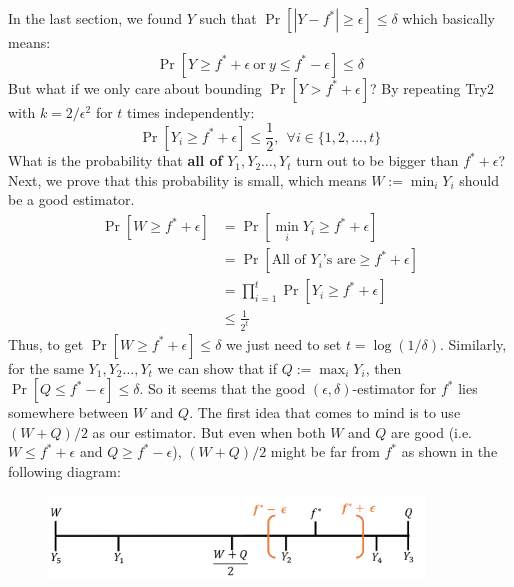 \documentclass[11pt]{article}
\begin{document}
In the last section, we found $Y$ such that $\Pr[|Y - f^*| \geq \epsilon] \leq \delta$ which basically means:
\begin{equation*}
    \Pr[Y \geq f^* + \epsilon \ \text{or} \  y \leq f^* - \epsilon] \leq \delta
\end{equation*}
But what if we only care about bounding $\Pr[Y > f^* + \epsilon]$? By repeating Try2 with $k = 2/\epsilon^2$ for $t$ times independently:
\begin{equation*}
    \Pr[Y_i \geq f^* + \epsilon] \leq \frac{1}{2}, \ \ \forall i\in\{1,2,\dots,t\}
\end{equation*}
What is the probability that \textbf{all of} $Y_1,Y_2\dots,Y_t$ turn out to be bigger than $f^* + \epsilon$? Next, we prove that this probability is small, which means $W := \min_i Y_i$ should be a good estimator.
\begin{align*}
    \Pr[W \geq f^* + \epsilon] &= \Pr[\min_i Y_i \geq f^* + \epsilon] \\&= \Pr[\text{All of $Y_i$'s are} \geq f^* + \epsilon]\\ &= \prod\limits_{i=1}^t \Pr[Y_i \geq f^* + \epsilon] \\&\leq \frac{1}{2^t}
\end{align*}
Thus, to get $\Pr[W \geq f^* + \epsilon] \leq \delta$ we just need to set $t = \log{(1/\delta)}$.
Similarly, for the same $Y_1,Y_2\dots,Y_t$ we can show that if $Q := \max_i Y_i$, then $\Pr[Q \leq f^* - \epsilon] \leq \delta$. So it seems that the good $(\epsilon,\delta)$-estimator for $f^*$ lies somewhere between $W$ and $Q$. The first idea that comes to mind is to use $(W+Q)/2$ as our estimator. But even when both $W$ and $Q$ are good (i.e. $W \leq f^*+ \epsilon$ and $Q \geq f^*- \epsilon$), $(W+Q)/2$ might be far from $f^*$ as shown in the following diagram:
\begin{figure}[h]
\centering
\includegraphics[width=10cm]{pic1.png}
\end{figure}
\end{document}
